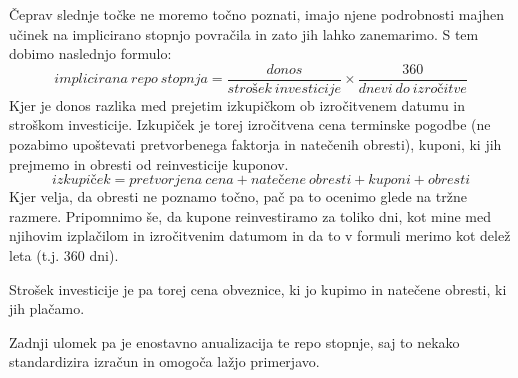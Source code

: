 \documentclass[a4paper, 11pt]{article}
\begin{document}
Čeprav slednje točke ne moremo točno poznati, imajo njene podrobnosti majhen učinek na 
implicirano stopnjo povračila in zato jih lahko zanemarimo. S tem dobimo naslednjo formulo:
%
$$ implicirana\:repo\:stopnja = \frac{donos}{strošek\:investicije} \times
\frac{360}{dnevi\:do\:izročitve} $$
%
Kjer je donos razlika med prejetim izkupičkom ob izročitvenem datumu in stroškom investicije.
Izkupiček je torej izročitvena cena terminske pogodbe (ne pozabimo upoštevati pretvorbenega 
faktorja in natečenih obresti), kuponi, ki jih prejmemo in obresti od reinvesticije kuponov. 
%
$$ izkupiček = pretvorjena\:cena + natečene\:obresti + kuponi + obresti $$
%
Kjer velja, da obresti ne poznamo točno, pač pa to ocenimo glede na tržne razmere. Pripomnimo
še, da kupone reinvestiramo za toliko dni, kot mine med njihovim izplačilom in izročitvenim
datumom in da to v formuli merimo kot delež leta (t.j. $360$ dni). 

Strošek investicije je pa torej cena obveznice, ki jo kupimo in natečene obresti, ki jih plačamo.

Zadnji ulomek pa je enostavno anualizacija te repo stopnje, saj to nekako standardizira izračun
in omogoča lažjo primerjavo. 
\end{document}
